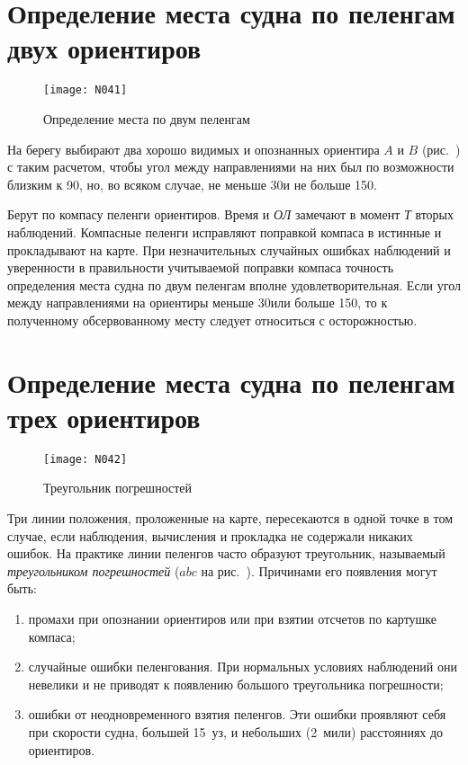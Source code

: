 \section{Определение места судна по пеленгам двух ориентиров}

\begin{figure}[htb]
  \centering{}
  \texttt{[image: N041]}
  \caption{Определение места по двум пеленгам}
  \label{fig:N41}
\end{figure}

На берегу выбирают два хорошо видимых и опознанных ориентира $A$ и $B$
(рис.~) с таким расчетом, чтобы угол между направлениями на
них был по возможности близким к 90\gr, но, во всяком случае, не
меньше 30\gr и не больше 150\gr.

Берут по компасу пеленги ориентиров. Время и \textit{ОЛ} замечают в
момент \textit{Т} вторых наблюдений. Компасные пеленги исправляют
поправкой компаса в истинные и прокладывают на карте. При
незначительных случайных ошибках наблюдений и уверенности в
правильности учитываемой поправки компаса точность определения места
судна по двум пеленгам вполне удовлетворительная. Если угол между
направлениями на ориентиры меньше 30\gr или больше 150\gr, то к
полученному обсервованному месту следует относиться с осторожностью.

\section{Определение места судна по пеленгам трех ориентиров}

\begin{figure}[htb]
  \centering{}
  \texttt{[image: N042]}
  \caption{Треугольник погрешностей}
  \label{fig:N42}
\end{figure}

Три линии положения, проложенные на карте, пересекаются в одной точке
в том случае, если наблюдения, вычисления и прокладка не содержали
никаких ошибок. На практике линии пеленгов часто образуют треугольник,
называемый \textit{треугольником погрешностей} 
($abc$ на рис.~). Причинами его появления могут быть:

\begin{enumerate}
\item промахи при опознании ориентиров или при взятии отсчетов по
  картушке компаса;
\item случайные ошибки пеленгования. При нормальных условиях
  наблюдений они невелики и не приводят к появлению большого
  треугольника погрешности;
\item ошибки от неодновременного взятия пеленгов. Эти ошибки проявляют
  себя при скорости судна, большей 15~уз, и небольших (2~мили) расстояниях до ориентиров.
\end{enumerate}

